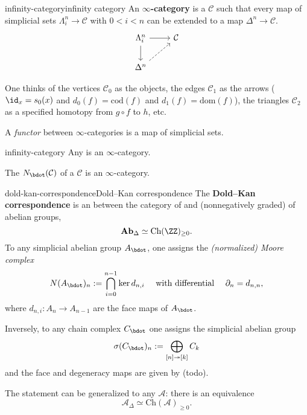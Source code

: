 \begin{topic}{infinity-category}{infinity category}
    An \textbf{$\infty$-category} is a  $\mathcal{C}$ such that every map of simplicial sets $\Lambda^n_i \to \mathcal{C}$ with $0 < i < n$ can be extended to a map $\Delta^n \to \mathcal{C}$.
    \[ \begin{tikzcd} \Lambda^n_i \arrow{r} \arrow{d} & \mathcal{C} \\ \Delta^n \arrow[dashed]{ur} & \end{tikzcd} \]
    
    One thinks of the vertices $\mathcal{C}_0$ as the objects, the edges $\mathcal{C}_1$ as the arrows ($\id_x = s_0(x)$ and $d_0(f) = \text{cod}(f)$ and $d_1(f) = \text{dom}(f)$), the triangles $\mathcal{C}_2$ as a specified homotopy from $g \circ f$ to $h$, etc.
    
    A \textit{functor} between $\infty$-categories is a map of simplicial sets.
\end{topic}

\begin{example}{infinity-category}
    Any  is an $\infty$-category.
    
    The  $N_\bdot(\mathcal{C})$ of a  $\mathcal{C}$ is an $\infty$-category.
\end{example}

\begin{topic}{dold-kan-correspondence}{Dold--Kan correspondence}
    The \textbf{Dold--Kan correspondence} is an  between the category of   and (nonnegatively graded)  of abelian groups,
    \[ \textbf{Ab}_\Delta \simeq \text{Ch}(\ZZ)_{\ge 0} . \]
    To any simplicial abelian group $A_\bdot$, one assigns the \textit{(normalized) Moore complex}
    \[ N(A_\bdot)_n := \bigcap_{i = 0}^{n - 1} \ker d_{n, i} \quad \text{ with differential } \quad \partial_n = d_{n, n}, \]
    where $d_{n, i} : A_n \to A_{n - 1}$ are the face maps of $A_\bdot$.
    
    Inversely, to any chain complex $C_\bdot$ one assigns the simplicial abelian group
    \[ \sigma(C_\bdot)_n := \bigoplus_{[n] \twoheadrightarrow [k]} C_k \]
    and the face and degeneracy maps are given by (todo).
    
    The statement can be generalized to any  $\mathcal{A}$: there is an equivalence
    \[ \mathcal{A}_\Delta \simeq \text{Ch}(\mathcal{A})_{\ge 0} . \]
\end{topic}

